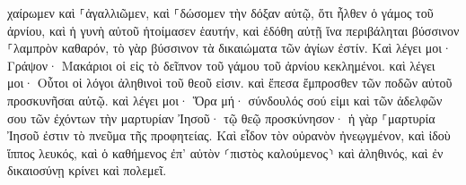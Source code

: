 \documentclass{openreader}
\begin{document}
χαίρωμεν καὶ ⸀ἀγαλλιῶμεν, καὶ ⸀δώσομεν τὴν δόξαν αὐτῷ, ὅτι ἦλθεν ὁ γάμος τοῦ ἀρνίου, καὶ ἡ γυνὴ αὐτοῦ ἡτοίμασεν ἑαυτήν, 
καὶ ἐδόθη αὐτῇ ἵνα περιβάληται βύσσινον ⸀λαμπρὸν καθαρόν, τὸ γὰρ βύσσινον τὰ δικαιώματα τῶν ἁγίων ἐστίν. 
Καὶ λέγει μοι· Γράψον· Μακάριοι οἱ εἰς τὸ δεῖπνον τοῦ γάμου τοῦ ἀρνίου κεκλημένοι. καὶ λέγει μοι· Οὗτοι οἱ λόγοι ἀληθινοὶ τοῦ θεοῦ εἰσιν. 
καὶ ἔπεσα ἔμπροσθεν τῶν ποδῶν αὐτοῦ προσκυνῆσαι αὐτῷ. καὶ λέγει μοι· Ὅρα μή· σύνδουλός σού εἰμι καὶ τῶν ἀδελφῶν σου τῶν ἐχόντων τὴν μαρτυρίαν Ἰησοῦ· τῷ θεῷ προσκύνησον· ἡ γὰρ ⸀μαρτυρία Ἰησοῦ ἐστιν τὸ πνεῦμα τῆς προφητείας. 
Καὶ εἶδον τὸν οὐρανὸν ἠνεῳγμένον, καὶ ἰδοὺ ἵππος λευκός, καὶ ὁ καθήμενος ἐπ’ αὐτὸν ⸂πιστὸς καλούμενος⸃ καὶ ἀληθινός, καὶ ἐν δικαιοσύνῃ κρίνει καὶ πολεμεῖ. 
\end{document}
